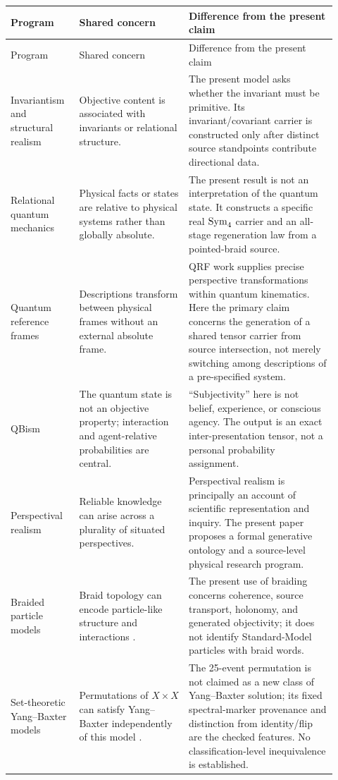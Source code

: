 {\small\setlength{\parskip}{0pt}
\begin{longtable}{>{\raggedright\arraybackslash}p{0.19\linewidth}>{\raggedright\arraybackslash}p{0.31\linewidth}>{\raggedright\arraybackslash}p{0.42\linewidth}}
\toprule
Program & Shared concern & Difference from the present claim \\
\midrule
\endfirsthead
\toprule
Program & Shared concern & Difference from the present claim \\
\midrule
\endhead
Invariantism and structural realism & Objective content is associated with invariants or relational structure. & The present model asks whether the invariant must be primitive. Its invariant/covariant carrier is constructed only after distinct source standpoints contribute directional data. \\
Relational quantum mechanics & Physical facts or states are relative to physical systems rather than globally absolute. & The present result is not an interpretation of the quantum state. It constructs a specific real $\operatorname{Sym}_4$ carrier and an all-stage regeneration law from a pointed-braid source. \\
Quantum reference frames & Descriptions transform between physical frames without an external absolute frame. & QRF work supplies precise perspective transformations within quantum kinematics. Here the primary claim concerns the generation of a shared tensor carrier from source intersection, not merely switching among descriptions of a pre-specified system. \\
QBism & The quantum state is not an objective property; interaction and agent-relative probabilities are central. & ``Subjectivity'' here is not belief, experience, or conscious agency. The output is an exact inter-presentation tensor, not a personal probability assignment. \\
Perspectival realism & Reliable knowledge can arise across a plurality of situated perspectives. & Perspectival realism is principally an account of scientific representation and inquiry. The present paper proposes a formal generative ontology and a source-level physical research program. \\
Braided particle models & Braid topology can encode particle-like structure and interactions \cite{bilsonthompson2005}. & The present use of braiding concerns coherence, source transport, holonomy, and generated objectivity; it does not identify Standard-Model particles with braid words. \\
Set-theoretic Yang--Baxter models & Permutations of $X\times X$ can satisfy Yang--Baxter independently of this model \cite{etingof1998}. & The 25-event permutation is not claimed as a new class of Yang--Baxter solution; its fixed spectral-marker provenance and distinction from identity/flip are the checked features. No classification-level inequivalence is established. \\

\end{longtable}}
